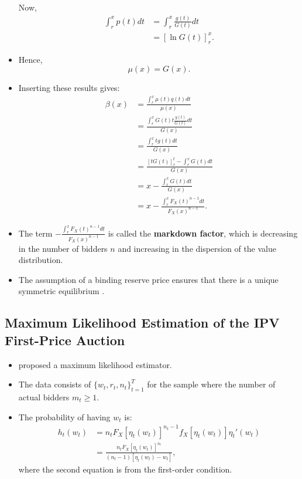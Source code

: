 \documentclass[]{book}
\providecommand{\tightlist}{%
  \setlength{\itemsep}{0pt}\setlength{\parskip}{0pt}}
\begin{document}
\begin{itemize}
  Now, \[
  \begin{split}
  \int_{r}^x p(t) dt &= \int_{r}^x \frac{g(t)}{G(t)} dt\\
  &= [\ln G(t)]_r^x.
  \end{split}
  \]
\item
  Hence, \[
  \mu(x) = G(x).
  \]
\item
  Inserting these results gives: \[
  \begin{split}
  \beta(x) &= \frac{\int_r^x \mu(t) q(t) dt}{\mu(x)}\\
  &= \frac{\int_r^x G(t) t \frac{g(t)}{G(t)} dt}{G(x)}\\
  &= \frac{\int_r^x t g(t) dt}{G(x)}\\
  &= \frac{[t G(t)]_r^t - \int_{r}^x G(t) dt }{G(x)}\\
  &= x - \frac{\int_r^x G(t) dt}{G(x)}\\
  &= x - \frac{\int_r^x F_X(t)^{n - 1} dt}{F_X(x)^{n - 1}}.
  \end{split}
  \]
\item
  The term \(- \frac{\int_r^x F_X(t)^{n - 1} dt}{F_X(x)^{n - 1}}\) is
  called the \textbf{markdown factor}, which is decreasing in the number
  of bidders \(n\) and increasing in the dispersion of the value
  distribution.
\item
  The assumption of a binding reserve price ensures that there is a
  unique symmetric equilibrium \citep{atheyChapter60Nonparametric2007}.
\end{itemize}

\subsection{Maximum Likelihood Estimation of the IPV First-Price
Auction}\label{maximum-likelihood-estimation-of-the-ipv-first-price-auction}

\begin{itemize}
\tightlist
\item
  \citet{donaldPiecewisePseudoMaximumLikelihood1993} proposed a maximum
  likelihood estimator.
\item
  The data consists of \(\{w_t, r_t, n_t\}_{t = 1}^T\) for the sample
  where the number of actual bidders \(m_t \ge 1\).
\item
  The probability of having \(w_t\) is: \[
  \begin{split}
  h_t(w_t) &= n_t F_X[\eta_t(w_t)]^{n_t - 1} f_X[\eta_t(w_t)] \eta_t'(w_t)\\
  &= \frac{n_t F_X[\eta_t(w_t)]^{n_t}}{(n_t - 1)[\eta_t(w_t) - w_t]},
  \end{split}
  \] where the second equation is from the first-order condition.
\end{itemize}
\end{document}
